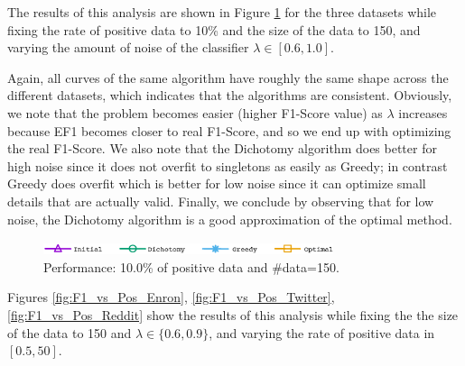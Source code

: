   The results of this analysis are shown in Figure \ref{fig:F1_vs_Lambda} for the three datasets while fixing the rate of positive data to 10\% and the size of the data to 150, and varying the amount of noise of the classifier $\lambda \in [0.6,1.0]$.


Again, all curves of the same algorithm have roughly the same shape across the different datasets, which indicates that the algorithms are consistent. 
Obviously, we note that the problem becomes easier  (higher F1-Score value) as $\lambda$ increases because EF1 becomes closer to real F1-Score, and so we end up with optimizing the real F1-Score.  
We also note that the Dichotomy algorithm does better for high noise since it does not overfit to singletons as easily as Greedy; in contrast Greedy does overfit which is better for low noise since it can optimize small details that are actually valid. Finally, we conclude by observing that for low noise, the Dichotomy algorithm is a good approximation of the optimal method.


\begin{figure}[H]
\begin{centering}
\includegraphics[width=8.5cm]{imgs/legend1}
\par\end{centering}
\begin{centering}
\par\end{centering}
\caption{Performance: 10.0\% of positive data and \#data=150.}
\label{fig:F1_vs_Lambda}
\end{figure}




 Figures \ref{fig:F1_vs_Pos_Enron}, \ref{fig:F1_vs_Pos_Twitter}, \ref{fig:F1_vs_Pos_Reddit} show the results of this analysis while fixing the  the size of the data to 150 and $\lambda\in \{0.6,0.9\}$, and varying the rate of positive data in $[0.5,50]$.




